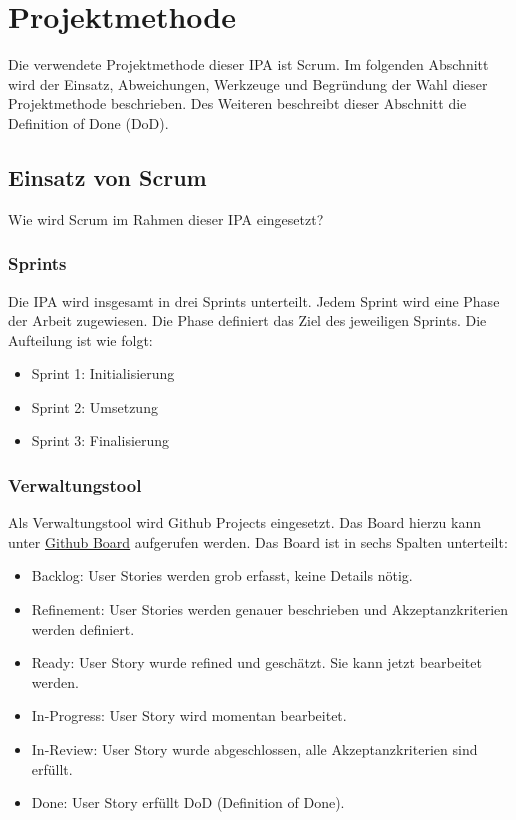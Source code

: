 \chapter{Projektmethode}
Die verwendete Projektmethode dieser IPA ist Scrum. Im folgenden Abschnitt wird der Einsatz, Abweichungen, Werkzeuge und Begründung der Wahl
dieser Projektmethode beschrieben. Des Weiteren beschreibt dieser Abschnitt die Definition of Done (DoD).

\section{Einsatz von Scrum}
Wie wird Scrum im Rahmen dieser IPA eingesetzt?

\subsection{Sprints}
Die IPA wird insgesamt in drei Sprints unterteilt. Jedem Sprint wird eine Phase der Arbeit zugewiesen. Die 
Phase definiert das Ziel des jeweiligen Sprints. Die Aufteilung ist wie folgt:

\begin{itemize}
    \item Sprint 1: Initialisierung
    \item Sprint 2: Umsetzung
    \item Sprint 3: Finalisierung
\end{itemize}

\subsection{Verwaltungstool}
Als Verwaltungstool wird Github Projects eingesetzt. Das Board hierzu kann unter \href{https://github.com/users/Vakmeth/projects/3/views/1}{Github Board}
aufgerufen werden. Das Board ist in sechs Spalten unterteilt: 

\begin{itemize}
    \item Backlog: User Stories werden grob erfasst, keine Details nötig.
    \item Refinement: User Stories werden genauer beschrieben und Akzeptanzkriterien werden definiert.
    \item Ready: User Story wurde refined und geschätzt. Sie kann jetzt bearbeitet werden.
    \item In-Progress: User Story wird momentan bearbeitet.
    \item In-Review: User Story wurde abgeschlossen, alle Akzeptanzkriterien sind erfüllt.
    \item Done: User Story erfüllt DoD (Definition of Done).
\end{itemize}

